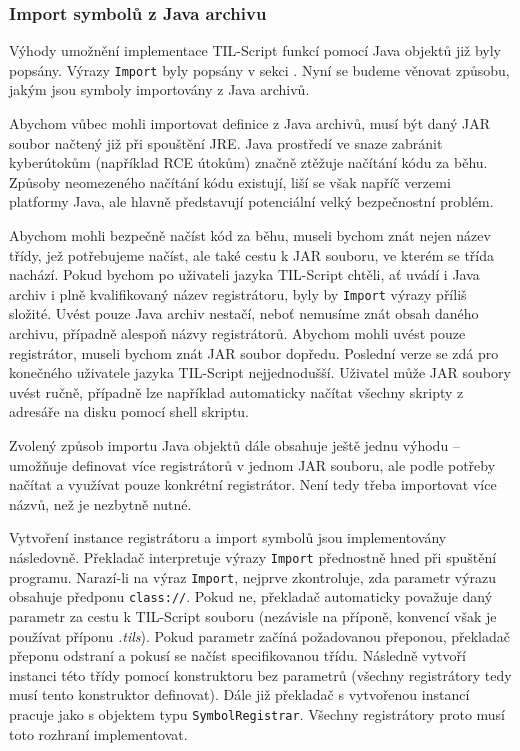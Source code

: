 \subsubsection{Import symbolů z Java archivu}\label{java-import}

Výhody umožnění implementace TIL-Script funkcí pomocí Java objektů již byly popsány. Výrazy
\lstinline{Import} byly popsány v sekci . Nyní se budeme věnovat způsobu,
jakým jsou symboly importovány z Java archivů.

Abychom vůbec mohli importovat definice z Java archivů, musí být daný JAR soubor načtený již při
spouštění JRE. Java prostředí ve snaze zabránit kyberútokům (například RCE útokům) značně ztěžuje
načítání kódu za běhu. Způsoby neomezeného načítání kódu existují, liší se však napříč verzemi
platformy Java, ale hlavně představují potenciální velký bezpečnostní problém.

Abychom mohli bezpečně načíst kód za běhu, museli bychom znát nejen název třídy, jež potřebujeme
načíst, ale také cestu k JAR souboru, ve kterém se třída nachází. Pokud bychom po uživateli jazyka
TIL-Script chtěli, ať uvádí i Java archiv i plně kvalifikovaný název registrátoru, byly by
\lstinline{Import} výrazy příliš složité. Uvést pouze Java archiv nestačí, neboť nemusíme znát obsah
daného archivu, případně alespoň názvy registrátorů. Abychom mohli uvést pouze registrátor, museli
bychom znát JAR soubor dopředu. Poslední verze se zdá pro konečného uživatele jazyka TIL-Script
nejjednodušší. Uživatel může JAR soubory uvést ručně, případně lze například automaticky načítat
všechny skripty z adresáře na disku pomocí shell skriptu.

Zvolený způsob importu Java objektů dále obsahuje ještě jednu výhodu -- umožňuje definovat více
registrátorů v jednom JAR souboru, ale podle potřeby načítat a využívat pouze konkrétní registrátor.
Není tedy třeba importovat více názvů, než je nezbytně nutné.

Vytvoření instance registrátoru a import symbolů jsou implementovány následovně. Překladač
interpretuje výrazy \lstinline{Import} přednostně hned při spuštění programu. Narazí-li na výraz
\lstinline{Import}, nejprve zkontroluje, zda parametr výrazu obsahuje předponu \lstinline{class://}.
Pokud ne, překladač automaticky považuje daný parametr za cestu k TIL-Script souboru (nezávisle
na příponě, konvencí však je používat příponu \textit{.tils}). Pokud parametr začíná požadovanou
přeponou, překladač přeponu odstraní a pokusí se načíst specifikovanou třídu. Následně vytvoří
instanci této třídy pomocí konstruktoru bez parametrů (všechny registrátory tedy musí tento
konstruktor definovat). Dále již překladač s vytvořenou instancí pracuje jako s objektem typu
\lstinline{SymbolRegistrar}. Všechny registrátory proto musí toto rozhraní implementovat.

